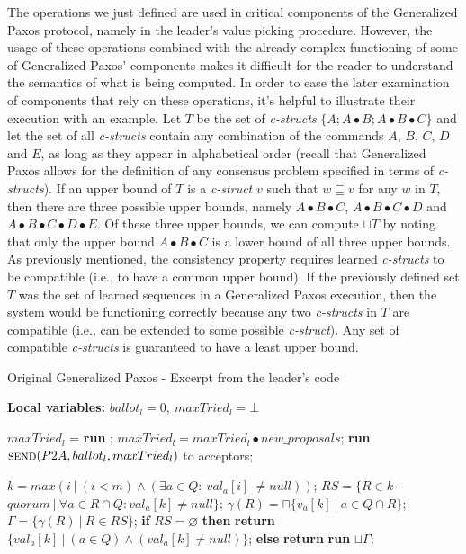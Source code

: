 The operations we just defined are used in critical components of the Generalized Paxos protocol, namely in the leader's value picking procedure. However, the usage of these operations combined with the already complex functioning of some of Generalized Paxos' components makes it difficult for the reader to understand the semantics of what is being computed. In order to ease the later examination of components that rely on these operations, it's helpful to illustrate their execution with an example. Let $T$ be the set of \textit{c-structs} $\{A ; A \bullet B ; A \bullet B \bullet C\}$ and let the set of all \textit{c-structs} contain any combination of the commands $A$, $B$, $C$, $D$ and $E$, as long as they appear in alphabetical order (recall that Generalized Paxos allows for the definition of any consensus problem specified in terms of \textit{c-structs}). If an upper bound of $T$ is a \textit{c-struct} $v$ such that $w \sqsubseteq v$ for any $w$ in $T$, then there are three possible upper bounds, namely $A \bullet B \bullet C$, $A \bullet B \bullet C \bullet D$ and $A \bullet B \bullet C \bullet D \bullet E$. Of these three upper bounds, we can compute $\sqcup T$ by noting that only the upper bound $A \bullet B \bullet C$ is a lower bound of all three upper bounds. As previously mentioned, the consistency property requires learned \textit{c-structs} to be compatible (i.e., to have a common upper bound). If the previously defined set $T$ was the set of learned sequences in a Generalized Paxos execution, then the system would be functioning correctly because any two \textit{c-structs} in $T$ are compatible (i.e., can be extended to some possible \textit{c-struct}). Any set of compatible \textit{c-structs} is guaranteed to have a least upper bound.\par 
\begin{algorithm}
	\caption{Original Generalized Paxos - Excerpt from the leader's code}
	\label{leader_excerpt}
	\textbf{Local variables:} $ballot_l = 0,\ maxTried_l = \bot$
	\begin{algorithmic}[1]
		\State $maxTried_l$ = \textbf{run} ;
		\State $maxTried_l = maxTried_l \bullet new\_proposals$;
		\State \textbf{run} $\Call{send}{P2A,ballot_l, maxTried_l}$ to acceptors;
		\EndFunction
		
		\State
		\State $k = max(i\ |\ (i < m) \wedge (\exists a \in Q :\ val_a[i]\ \neq null))$;
		\State $RS = \{R \in k$-$quorum\ |\ \forall a \in R \cap Q : val_a[k] \neq null\}$;
		\State $\gamma(R) = \sqcap \{v_a[k]\ |\ a \in Q \cap R \}$;
		\State $\Gamma = \{\gamma(R)\ |\ R \in RS \}$;
		\State
		\State \textbf{if} $RS = \varnothing$ \textbf{then}
		\State \hspace{\algorithmicindent} \textbf{return} $\{val_a[k]\ |\ (a \in Q) \wedge (val_a[k] \neq null)\}$;
		\State \textbf{else}
		\State \hspace{\algorithmicindent} \textbf{return} \textbf{run} $\sqcup \Gamma$;
		\EndFunction
		
	\end{algorithmic}
\end{algorithm}
